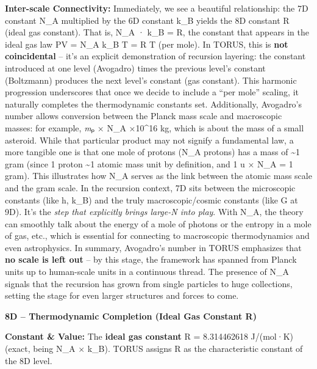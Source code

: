 \documentclass[
]{article}
\begin{document}
{\textbf{Inter-scale Connectivity:} Immediately, we see a beautiful
relationship: the 7D constant N\_A multiplied by the 6D constant k\_B
yields the 8D constant R (ideal gas constant)\hspace{0pt}. That is, N\_A
· k\_B = R, the constant that appears in the ideal gas law PV = N\_A
k\_B T = R T (per mole). In TORUS, this is \textbf{not coincidental} --
it's an explicit demonstration of recursion layering: the constant
introduced at one level (Avogadro) times the previous level's constant
(Boltzmann) produces the next level's constant (gas
constant)\hspace{0pt}. This harmonic progression underscores that once
we decide to include a ``per mole'' scaling, it naturally completes the
thermodynamic constants set. Additionally, Avogadro's number allows
conversion between the Planck mass scale and macroscopic masses: for
example, \emph{m}ₚ × N\_A ×10\^{}16 kg\hspace{0pt}, which is about
the mass of a small asteroid. While that particular product may not
signify a fundamental law, a more tangible one is that one mole of
protons (N\_A protons) has a mass of \textasciitilde1 gram (since 1
proton \textasciitilde1 atomic mass unit by definition, and 1 u × N\_A =
1 gram). This illustrates how N\_A serves as the link between the atomic
mass scale and the gram scale\hspace{0pt}. In the recursion context, 7D
sits between the microscopic constants (like h, k\_B) and the truly
macroscopic/cosmic constants (like G at 9D). It's the \emph{step that
explicitly brings large-N into play}. With N\_A, the theory can smoothly
talk about the energy of a mole of photons or the entropy in a mole of
gas, etc., which is essential for connecting to macroscopic
thermodynamics and even astrophysics. In summary, Avogadro's number in
TORUS emphasizes that \textbf{no scale is left out} -- by this stage,
the framework has spanned from Planck units up to human-scale units in a
continuous thread\hspace{0pt}. The presence of N\_A signals that the
recursion has grown from single particles to huge collections, setting
the stage for even larger structures and forces to come.

\textbf{8D -- Thermodynamic Completion (Ideal Gas Constant R)}

\textbf{Constant \& Value:} The \textbf{ideal gas constant} R =
8.314462618 J/(mol·K) (exact, being N\_A × k\_B)\hspace{0pt}. TORUS
assigns R as the characteristic constant of the 8D level.

}
\end{document}
